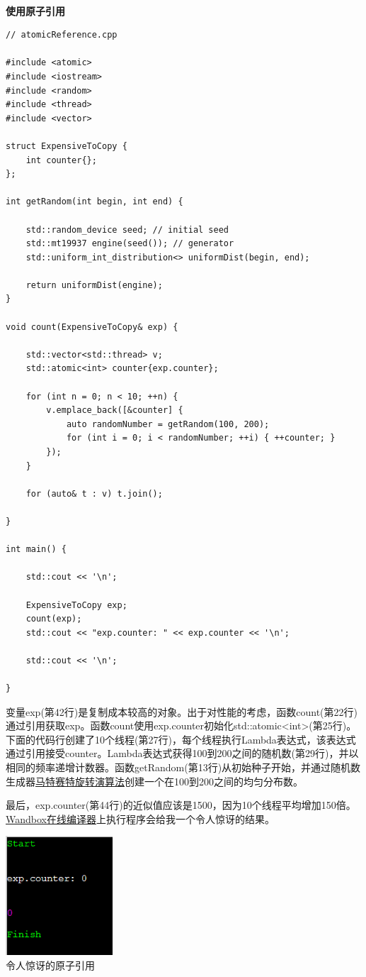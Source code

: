 \hspace*{\fill} \\ %
\noindent
\textbf{使用原子引用}
\begin{lstlisting}[style=styleCXX]
// atomicReference.cpp

#include <atomic>
#include <iostream>
#include <random>
#include <thread>
#include <vector>

struct ExpensiveToCopy {
	int counter{};
};

int getRandom(int begin, int end) {
	
	std::random_device seed; // initial seed
	std::mt19937 engine(seed()); // generator
	std::uniform_int_distribution<> uniformDist(begin, end);
	
	return uniformDist(engine);
}

void count(ExpensiveToCopy& exp) {

	std::vector<std::thread> v;
	std::atomic<int> counter{exp.counter};
	
	for (int n = 0; n < 10; ++n) {
		v.emplace_back([&counter] {
			auto randomNumber = getRandom(100, 200);
			for (int i = 0; i < randomNumber; ++i) { ++counter; }
		});
	}
	
	for (auto& t : v) t.join();

}

int main() {
	
	std::cout << '\n';
	
	ExpensiveToCopy exp;
	count(exp);
	std::cout << "exp.counter: " << exp.counter << '\n';
	
	std::cout << '\n';

}
\end{lstlisting}

变量exp(第42行)是复制成本较高的对象。出于对性能的考虑，函数count(第22行)通过引用获取exp。函数count使用exp.counter初始化std::atomic<int>(第25行)。下面的代码行创建了10个线程(第27行)，每个线程执行Lambda表达式，该表达式通过引用接受counter。Lambda表达式获得100到200之间的随机数(第29行)，并以相同的频率递增计数器。函数getRandom(第13行)从初始种子开始，并通过随机数生成器\href{https://en.wikipedia.org/wiki/Mersenne_Twister}{马特赛特旋转演算法}创建一个在100到200之间的均匀分布数。

最后，exp.counter(第44行)的近似值应该是1500，因为10个线程平均增加150倍。\href{https://wandbox.org/}{Wandbox在线编译器}上执行程序会给我一个令人惊讶的结果。

\begin{center}
\includegraphics[width=0.3\textwidth]{content/3/chapter6/images/8.png}\\
令人惊讶的原子引用
\end{center}

